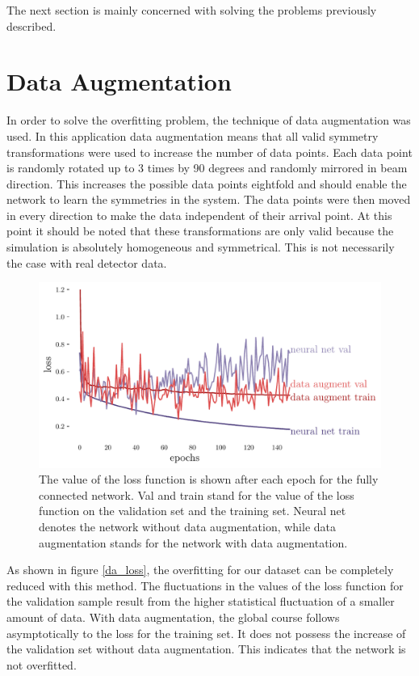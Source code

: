 \documentclass[12pt, a4paper]{thesis}
\begin{document}
The next section is mainly concerned with solving the problems previously
described.

\section{Data Augmentation}
\label{sec:org4a347fb}

In order to solve the overfitting problem, the technique of data augmentation
was used. In this application data augmentation means that all valid symmetry
transformations were used to increase the number of data points. Each data point
is randomly rotated up to 3 times by 90 degrees and randomly mirrored in beam
direction. This increases the possible data points eightfold and should enable
the network to learn the symmetries in the system. The data points were then
moved in every direction to make the data independent of their arrival point. At
this point it should be noted that these transformations are only valid because
the simulation is absolutely homogeneous and symmetrical. This is not
necessarily the case with real detector data.

\begin{figure}[htbp]
\centering
\includegraphics[width=.9\linewidth]{../images/data_augment_loss.pdf}
\caption{\label{fig:orgf671fb1}
The value of the loss function is shown after each epoch for the fully connected network. Val and train stand for the value of the loss function on the validation set and the training set. Neural net denotes the network without data augmentation, while data augmentation stands for the network with data augmentation.}
\end{figure} 

As shown in figure \ref{da_loss}, the overfitting for our dataset can be
completely reduced with this method.  The fluctuations in the values
of the loss function for the validation sample result from the higher
statistical fluctuation of a smaller amount of data. With data
augmentation, the global course follows asymptotically to the loss for
the training set. It does not possess the increase of the validation
set without data augmentation. This indicates that the network is not
overfitted.
\end{document}
